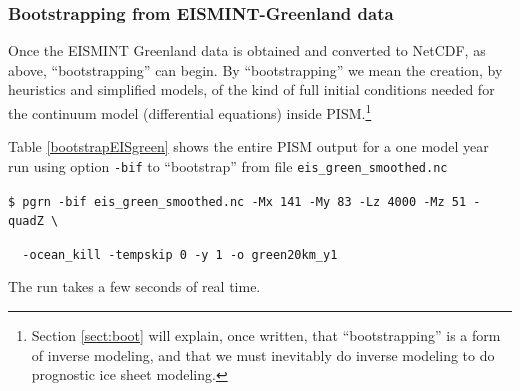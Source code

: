 \documentclass[11pt,final]{amsart}
\begin{document}
\subsubsection*{Bootstrapping from EISMINT-Greenland data}  Once the EISMINT Greenland data is obtained and converted to NetCDF, as above, ``bootstrapping'' can begin.  By ``bootstrapping'' we mean the creation, by heuristics and simplified models, of the kind of full initial conditions needed for the continuum model (differential equations) inside PISM.\footnote{Section \ref{sect:boot} will explain, once written, that ``bootstrapping'' is a form of inverse modeling, and that we must inevitably do inverse modeling to do prognostic ice sheet modeling.}

Table \ref{bootstrapEISgreen} shows the entire PISM output for a one model year run using option \verb|-bif| to ``bootstrap'' from file \verb|eis_green_smoothed.nc|

\verb|$ pgrn -bif eis_green_smoothed.nc -Mx 141 -My 83 -Lz 4000 -Mz 51 -quadZ \|

\verb|  -ocean_kill -tempskip 0 -y 1 -o green20km_y1|

\noindent The run takes a few seconds of real time.
\end{document}
